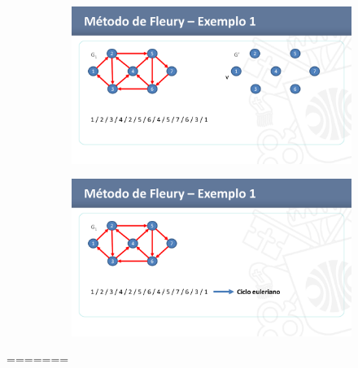 \begin{figure}[htbp]
	\begin{subfigure}{.4\textwidth}
		\centering
		\includegraphics[width=\textwidth]{imagem/graficos/1a1455b7b9174768d1c6a0d41673e79dHTztESkzBtQzsXWu-49.png}
	\end{subfigure}
	\begin{subfigure}{.4\textwidth}
		\centering
		\includegraphics[width=\textwidth]{imagem/graficos/1a1455b7b9174768d1c6a0d41673e79dHTztESkzBtQzsXWu-50.png}
	\end{subfigure}
\end{figure}

=======
